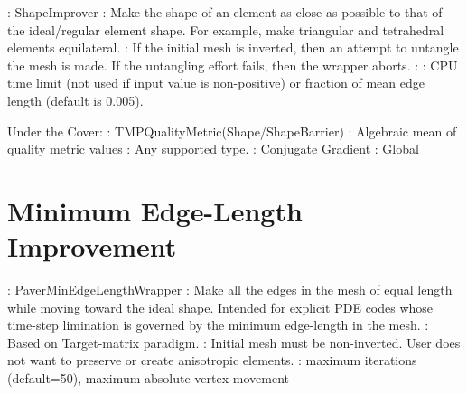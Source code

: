 : ShapeImprover \newline
{}: Make the shape of an element as close as possible to 
that of the ideal/regular element shape. For example, make triangular and 
tetrahedral elements equilateral. \newline
{}: If the initial mesh is inverted, then an attempt to 
untangle the mesh is made. If the untangling effort fails, then the wrapper
aborts.  \newline
{}:  \newline 
{}: CPU time limit (not used if input 
value is non-positive) or fraction of mean edge length (default is 0.005). \newline \newline

\noindent Under the Cover: \newline
{}: TMPQualityMetric(Shape/ShapeBarrier) \newline
{}: Algebraic mean of quality metric values \newline
{}: Any supported type. \newline
{}: Conjugate Gradient \newline
{}: Global \newline


\section{Minimum Edge-Length Improvement} \label{sec:PaverMinEdgeLengthWrapper}

: PaverMinEdgeLengthWrapper \newline
{}: Make all the edges in the mesh of equal length while 
moving toward the ideal shape. Intended for explicit PDE codes whose 
time-step limination is governed by the minimum edge-length in the mesh. \newline
{}: Based on Target-matrix paradigm. \newline
{}: Initial mesh must be non-inverted. User does not want to preserve or create anisotropic elements. \newline 
{}: maximum iterations (default=50), maximum absolute vertex movement \newline \newline

